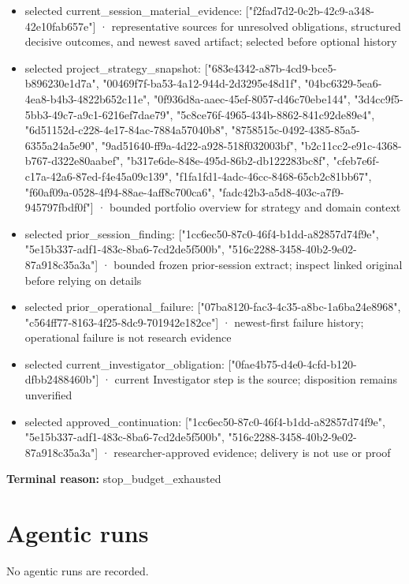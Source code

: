 \documentclass[11pt]{article}
\begin{document}
\begin{itemize}
\item selected current\_session\_material\_evidence: ["f2fad7d2-0c2b-42c9-a348-42e10fab657e"] · representative sources for unresolved obligations, structured decisive outcomes, and newest saved artifact; selected before optional history
\item selected project\_strategy\_snapshot: ["683e4342-a87b-4cd9-bce5-b896230e1d7a", "00469f7f-ba53-4a12-944d-2d3295e48d1f", "04bc6329-5ea6-4ea8-b4b3-4822b652c11e", "0f936d8a-aaec-45ef-8057-d46c70ebe144", "3d4cc9f5-5bb3-49c7-a9c1-6216ef7dae79", "5c8ce76f-4965-434b-8862-841c92de89e4", "6d51152d-c228-4e17-84ac-7884a57040b8", "8758515c-0492-4385-85a5-6355a24a5e90", "9ad51640-ff9a-4d22-a928-518f032003bf", "b2c11cc2-e91c-4368-b767-d322e80aabef", "b317e6de-848e-495d-86b2-db122283bc8f", "cfeb7e6f-c17a-42a6-87ed-f4e45a09c139", "f1fa1fd1-4adc-46cc-8468-65cb2c81bb67", "f60af09a-0528-4f94-88ae-4aff8c700ca6", "fadc42b3-a5d8-403c-a7f9-945797fbdf0f"] · bounded portfolio overview for strategy and domain context
\item selected prior\_session\_finding: ["1cc6ec50-87c0-46f4-b1dd-a82857d74f9e", "5e15b337-adf1-483c-8ba6-7cd2de5f500b", "516c2288-3458-40b2-9e02-87a918c35a3a"] · bounded frozen prior-session extract; inspect linked original before relying on details
\item selected prior\_operational\_failure: ["07ba8120-fac3-4c35-a8bc-1a6ba24e8968", "c564ff77-8163-4f25-8dc9-701942e182ce"] · newest-first failure history; operational failure is not research evidence
\item selected current\_investigator\_obligation: ["0fae4b75-d4e0-4cfd-b120-dfbb2488460b"] · current Investigator step is the source; disposition remains unverified
\item selected approved\_continuation: ["1cc6ec50-87c0-46f4-b1dd-a82857d74f9e", "5e15b337-adf1-483c-8ba6-7cd2de5f500b", "516c2288-3458-40b2-9e02-87a918c35a3a"] · researcher-approved evidence; delivery is not use or proof
\end{itemize}
\textbf{Terminal reason:} stop\_budget\_exhausted\par
\section{Agentic runs}
No agentic runs are recorded.\par
\end{document}
